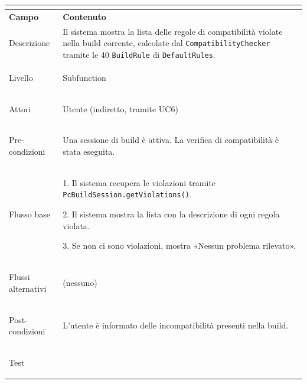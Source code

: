 \documentclass[11pt, a4paper]{article}
\begin{document}
\vspace{10pt}




\noindent

\begin{tabularx}{\textwidth}{|>{\bfseries}p{3.8cm}|X|}

\hline

\multicolumn{2}{|l|}{\textbf{UC7 --- Consulta violazioni}} \\

\hline

Campo & \textbf{Contenuto} \\

\hline

Descrizione & Il sistema mostra la lista delle regole di compatibilità violate nella build corrente, calcolate dal \texttt{CompatibilityChecker} tramite le 40 \texttt{BuildRule} di \texttt{DefaultRules}. \\

\hline

Livello & Subfunction \\

\hline

Attori & Utente (indiretto, tramite UC6) \\

\hline

Pre-condizioni & Una sessione di build è attiva. La verifica di compatibilità è stata eseguita. \\

\hline

Flusso base & 

1. Il sistema recupera le violazioni tramite \texttt{PcBuildSession.getViolations()}.\newline

2. Il sistema mostra la lista con la descrizione di ogni regola violata.\newline

3. Se non ci sono violazioni, mostra «Nessun problema rilevato». \\

\hline

Flussi alternativi & (nessuno) \\

\hline

Post-condizioni & L'utente è informato delle incompatibilità presenti nella build. \\

\hline

Test & \\

\hline

\end{tabularx}
\end{document}
